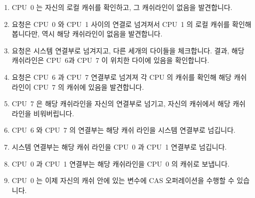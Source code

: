 \begin{enumerate}
\item	CPU~0 는 자신의 로컬 캐쉬를 확인하고, 그 캐쉬라인이 없음을 발견합니다.
\item	요청은 CPU~0 와 CPU~1 사이의 연결로 넘겨져서 CPU~1 의 로컬 캐쉬를
	확인해봅니다만, 역시 해당 캐쉬라인이 없음을 발견합니다.
\item	요청은 시스템 연결부로 넘겨지고, 다른 세개의 다이들을 체크합니다. 결과,
	해당 캐쉬라인은 CPU~6과 CPU~7 이 위치한 다이에 있음을 확인합니다.
\item	요청은 CPU~6 과 CPU~7 연결부로 넘겨져 각 CPU 의 캐쉬를 확인해 해당 캐쉬
	라인이 CPU~7 의 캐쉬에 있음을 발견합니다.
\item	CPU~7 은 해당 캐쉬라인을 자신의 연결부로 넘기고, 자신의 캐쉬에서 해당
	캐쉬라인을 비워버립니다.
\item	CPU~6 와 CPU~7 의 연결부는 해당 캐쉬 라인을 시스템 연결부로 넘깁니다.
\item	시스템 연결부는 해당 캐쉬 라인을 CPU~0 과 CPU~1 연결부로 넘깁니다.
\item	CPU~0 과 CPU~1 연결부는 해당 캐쉬라인을 CPU~0 의 캐쉬로 보냅니다.
\item	CPU~0 는 이제 자신의 캐쉬 안에 있는 변수에 CAS 오퍼레이션을 수행할 수
	있습니다.
\end{enumerate}

